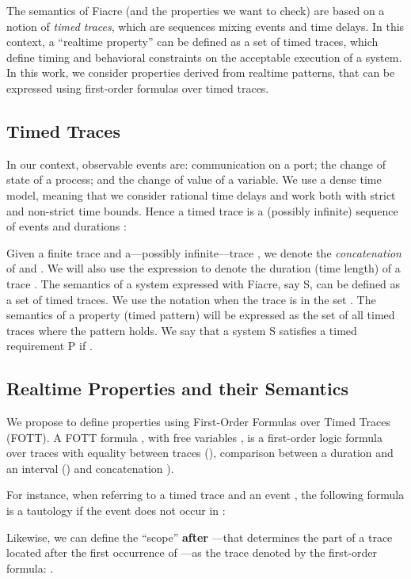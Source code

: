 \documentclass[a4paper]{scrartcl}
\def\code#1{\textsf{\small\bfseries #1}}
\def\vars#1{\textsf{\small #1}}
\begin{document}
The semantics of Fiacre (and the properties we want to check) are
based on a notion of \emph{timed traces}, which are sequences mixing
events and time delays. In this context, a ``realtime property'' can
be defined as a set of timed traces, which define timing and
behavioral constraints on the acceptable execution of a system. In
this work, we consider properties derived from realtime patterns, that
can be expressed using first-order formulas over timed traces.

\subsection{Timed Traces} 
In our context, observable events are: communication on a port; the
change of state of a process; and the change of value of a
variable. We use a dense time model, meaning that we consider rational
time delays and work both with strict and non-strict time
bounds. Hence a timed trace is a (possibly infinite) sequence of
events  and durations :



Given a finite trace  and a---possibly infinite---trace , we
denote  the \emph{concatenation} of  and .  We will
also use the expression  to denote the duration (time
length) of a trace . The semantics of a system expressed with
Fiacre, say \vars{S}, can be defined as a set  of
timed traces. We use the notation  when the trace
 is in the set .  The semantics of a property
(timed pattern) will be expressed as the set of all timed traces where
the pattern holds.  We say that a system \vars{S} satisfies a timed
requirement \vars{P} if .

\subsection{Realtime Properties and their Semantics}
We propose to define properties using First-Order Formulas over Timed
Traces (FOTT). A FOTT formula , with free variables
, is a first-order logic formula over
traces with equality between traces (), comparison between a
duration and an interval () and concatenation ).

For instance, when referring to a timed trace  and an event ,
the following formula is a tautology if the event  does not occur
in :

Likewise, we can define the ``scope''  \code{after} ---that
determines the part of a trace  located after the first occurrence
of ---as the trace  denoted by the first-order formula:
.
\end{document}
